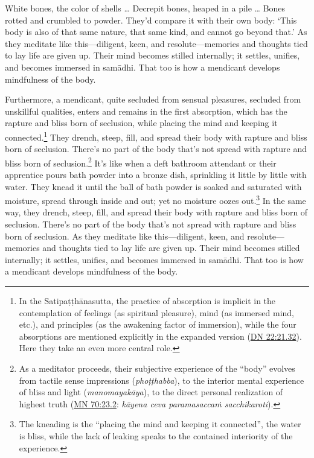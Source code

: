 \documentclass[12pt,openany]{book}%
\begin{document}
White bones, the color of shells … Decrepit bones, heaped in a pile … Bones rotted and crumbled to powder. They’d compare it with their own body: ‘This body is also of that same nature, that same kind, and cannot go beyond that.’ As they meditate like this—diligent, keen, and resolute—memories and thoughts tied to lay life are given up. Their mind becomes stilled internally; it settles, unifies, and becomes immersed in \textsanskrit{samādhi}. That too is how a mendicant develops mindfulness of the body. 

Furthermore, a mendicant, quite secluded from sensual pleasures, secluded from unskillful qualities, enters and remains in the first absorption, which has the rapture and bliss born of seclusion, while placing the mind and keeping it connected.\footnote{In the \textsanskrit{Satipaṭṭhānasutta}, the practice of absorption is implicit in the contemplation of feelings (as spiritual pleasure), mind (as immersed mind, etc.), and principles (as the awakening factor of immersion), while the four absorptions are mentioned explicitly in the expanded version (\href{https://suttacentral.net/dn22/en/sujato\#21.32}{DN 22:21.32}). Here they take an even more central role. } They drench, steep, fill, and spread their body with rapture and bliss born of seclusion. There’s no part of the body that’s not spread with rapture and bliss born of seclusion.\footnote{As a meditator proceeds, their subjective experience of the “body” evolves from tactile sense impressions (\textit{\textsanskrit{phoṭṭhabba}}), to the interior mental experience of bliss and light (\textit{\textsanskrit{manomayakāya}}), to the direct personal realization of highest truth (\href{https://suttacentral.net/mn70/en/sujato\#23.2}{MN 70:23.2}: \textit{\textsanskrit{kāyena} ceva \textsanskrit{paramasaccaṁ} sacchikaroti}). } It’s like when a deft bathroom attendant or their apprentice pours bath powder into a bronze dish, sprinkling it little by little with water. They knead it until the ball of bath powder is soaked and saturated with moisture, spread through inside and out; yet no moisture oozes out.\footnote{The kneading is the “placing the mind and keeping it connected”, the water is bliss, while the lack of leaking speaks to the contained interiority of the experience. } In the same way, they drench, steep, fill, and spread their body with rapture and bliss born of seclusion. There’s no part of the body that’s not spread with rapture and bliss born of seclusion. As they meditate like this—diligent, keen, and resolute—memories and thoughts tied to lay life are given up. Their mind becomes stilled internally; it settles, unifies, and becomes immersed in \textsanskrit{samādhi}. That too is how a mendicant develops mindfulness of the body. 
\end{document}
